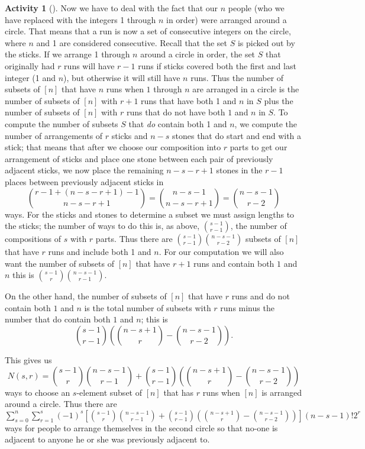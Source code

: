 \documentclass[10pt,]{book}
\theoremstyle{plain}
\theoremstyle{definition}
\newtheorem{activity}[project]{Activity}
\numberwithin{equation}{chapter}
\begin{document}
\begin{activity}[]
Now we have to deal with the fact that our \(n\) people (who we have replaced with the integers 1 through \(n\) in order) were arranged around a circle. That means that a run is now a set of consecutive integers on the circle, where \(n\) and 1 are considered consecutive. Recall that the set \(S\) is picked out by the sticks. If we arrange 1 through \(n\) around a circle in order, the set \(S\) that originally had \(r\) runs will have \(r-1\) runs if sticks covered both the first and last integer (1 and \(n\)), but otherwise it will still have \(n\) runs. Thus the number of subsets of \([n]\) that have \(n\) runs when \(1\) through \(n\) are arranged in a circle is the number of subsets of \([n]\) with \(r+1\) runs that have both 1 and \(n\) in \(S\) plus the number of subsets of \([n]\) with \(r\) runs that do not have both \(1\) and \(n\) in \(S\). To compute the number of subsets \(S\) that \emph{do} contain both 1 and \(n\), we compute the number of arrangements of \(r\) sticks and \(n-s\) stones that do start and end with a stick; that means that after we choose our composition into \(r\) parts to get our arrangement of sticks and place one stone between each pair of previously adjacent sticks, we now place the remaining \(n-s-r+1\) stones in the \(r-1\) places between previously adjacent sticks in%
\begin{equation*}
\binom{r-1 + (n-s-r+1)-1}{n-s-r+1}=\binom{n-s-1}{n-s-r+1}=\binom{n-s-1}{r-2}
\end{equation*}
ways. For the sticks and stones to determine a subset we must assign lengths to the sticks; the number of ways to do this is, as above, \(\binom{s-1}{r-1}\), the number of compositions of \(s\) with \(r\) parts. Thus there are \(\binom{s-1}{r-1}\binom{n-s-1}{r-2}\) subsets of \([n]\) that have \(r\) runs and include both 1 and \(n\). For our computation we will also want the number of subsets of \([n]\) that have \(r+1\) runs and contain both \(1\) and \(n\) this is \(\binom{s-1}{r}\binom{n-s-1}{r-1}\).%
\par
On the other hand, the number of subsets of \([n]\) that have \(r\) runs and do not contain both \(1\) and \(n\) is the total number of subsets with \(r\) runs minus the number that do contain both \(1\) and \(n\); this is%
\begin{equation*}
\binom{s-1}{r-1}\left(\binom{n-s+1}{r}- \binom{n-s-1}{r-2}\right).
\end{equation*}
%
\par
This gives us%
\begin{equation*}
N(s,r) =\binom{s-1}{r}\binom{n-s-1}{r-1}+\binom{s-1}{r-1}\left(\binom{n-s+1}{r}- \binom{n-s-1}{r-2}\right)
\end{equation*}
ways to choose an \(s\)-element subset of \([n]\) that has \(r\) runs when \([n]\) is arranged around a circle. Thus there are \(\sum\limits_{s=0}^n\sum\limits_{r=1}^{s}(-1)^s\left[\binom{s-1}{r}\binom{n-s-1}{r-1}+\binom{s-1}{r-1}\left(\binom{n-s+1}{r}- \binom{n-s-1}{r-2}\right)\right](n-s-1)!2^r\) ways for people to arrange themselves in the second circle so that no-one is adjacent to anyone he or she was previously adjacent to.%
\end{activity}
\end{document}
